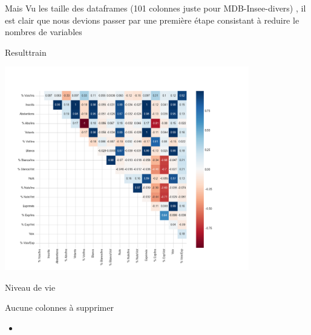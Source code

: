     
    \begin{frame}
    Mais Vu les taille des dataframes (101 colonnes juste pour MDB-Insee-divers) , il est clair que nous devions passer par une première étape consistant à reduire le nombres de variables 
    \end{frame}
    
    \begin{frame}{Resulttrain}
        
        \begin{center}
        \includegraphics[width=0.8\textwidth]{figures/corr_matrix_res_train.png}
        \end{center}
        
        
    \end{frame}

    \begin{frame}{Niveau de vie}

        Aucune colonnes à supprimer 

        
        \begin{itemize}
            \item 
        \end{itemize}
    \end{frame}
